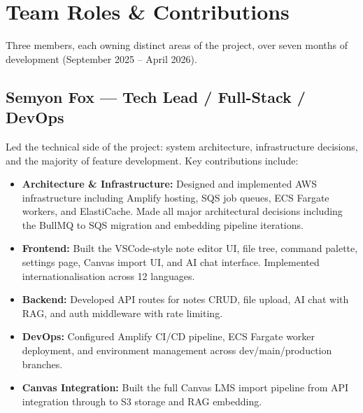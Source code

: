 \documentclass[12pt,a4paper]{article}
\begin{document}
\section{Team Roles \& Contributions}
\label{sec:team}

Three members, each owning distinct areas of the project, over seven months of development (September 2025 -- April 2026).

\subsection{Semyon Fox --- Tech Lead / Full-Stack / DevOps}

Led the technical side of the project: system architecture, infrastructure decisions, and the majority of feature development. Key contributions include:

\begin{itemize}[leftmargin=1.5em]
    \item \textbf{Architecture \& Infrastructure:} Designed and implemented AWS infrastructure including Amplify hosting, SQS job queues, ECS Fargate workers, and ElastiCache. Made all major architectural decisions including the BullMQ to SQS migration and embedding pipeline iterations.
    \item \textbf{Frontend:} Built the VSCode-style note editor UI, file tree, command palette, settings page, Canvas import UI, and AI chat interface. Implemented internationalisation across 12 languages.
    \item \textbf{Backend:} Developed API routes for notes CRUD, file upload, AI chat with RAG, and auth middleware with rate limiting.
    \item \textbf{DevOps:} Configured Amplify CI/CD pipeline, ECS Fargate worker deployment, and environment management across dev/main/production branches.
    \item \textbf{Canvas Integration:} Built the full Canvas LMS import pipeline from API integration through to S3 storage and RAG embedding.
\end{itemize}
\end{document}

